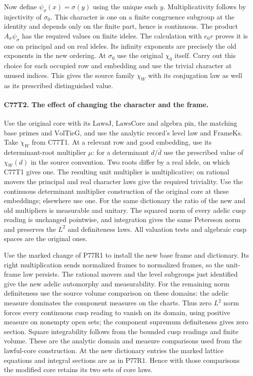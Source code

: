 Now define $\psi_\sigma(x)=\sigma(y)$ using the unique such $y$.
Multiplicativity follows by injectivity of $\sigma_0$.
This character is one on a finite congruence subgroup at the
identity and depends only on the finite part, hence is continuous.
The product $A_\sigma\psi_\sigma$ has the required values on
finite ideles. The calculation with $e_0r$ proves it is one on
principal and on real ideles. Its infinity exponents are precisely
the old exponents in the new ordering. At $\sigma_0$ use the
original $\chi_0$ itself. Carry out this choice for each occupied
row and embedding and use the trivial character at unused indices.
This gives the source family $\chi_W$ with its conjugation law
as well as its prescribed distinguished value.

\paragraph{C77T2. The effect of changing the character and the frame.}
Use the original core with its $\mathrm{LawsJ}$, $\mathrm{LawsCore}$
and algebra pin, the matching base primes and $\mathrm{VolTieG}$,
and use the analytic record's level law and $\mathrm{FrameKs}$.
Take $\chi_W$ from C77T1. At a relevant row and good embedding,
use its determinant-root multiplier $\mu$: for a determinant
$d/\bar d$ use the prescribed value of $\chi_W(d)$ in the source
convention. Two roots differ by a real idele, on which C77T1 gives
one. The resulting unit multiplier is multiplicative; on rational
movers the principal and real character laws give the required
triviality. Use the continuous determinant multiplier construction
of the original core at these embeddings; elsewhere use one.
For the same dictionary the ratio of the new and old multipliers
is measurable and unitary. The squared norm of every adelic cusp
reading is unchanged pointwise, and integration gives the same
Petersson norm and preserves the $L^2$ and definiteness laws.
All valuation tests and algebraic cusp spaces are the original ones.

Use the marked change of P77R1 to install the new base frame and
dictionary. Its right multiplication sends normalized frames to
normalized frames, so the unit-frame law persists. The rational
movers and the level subgroups just identified give the new
adelic automorphy and measurability. For the remaining norm
definiteness use the source volume comparison on these domains:
the adelic measure dominates the component measures on the charts.
Thus zero $L^2$ norm forces every continuous cusp reading to
vanish on its domain, using positive measure on nonempty open
sets; the component supremum definiteness gives zero section.
Square integrability follows from the bounded cusp readings and
finite volume. These are the analytic domain and measure
comparisons used from the lawful-core construction. At the new
dictionary entries the marked lattice equations and integral
sections are as in P77R1. Hence with those comparisons the
modified core retains its two sets of core laws.

